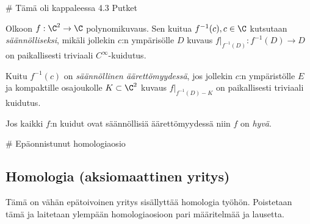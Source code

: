 # Tämä oli kappaleessa 4.3 Putket
\begin{maaritelma}
    Olkoon $f:\C^2\to\C$ polynomikuvaus. Sen kuitua $f^{-1}(c),c\in\C$ kutsutaan \emph{säännölliseksi}, mikäli jollekin $c$:n ympärisölle $D$ kuvaus $f|_{f^{-1}(D)}:f^{-1}(D)\to D$ on paikallisesti triviaali $C^\infty$-kuidutus.

    Kuitu $f^{-1}(c)$ on \emph{säännöllinen äärettömyydessä}, jos jollekin $c$:n ympäristölle $E$ ja kompaktille osajoukolle $K\subset\C^2$ kuvaus $f|_{f^{-1}(D)-K}$ on paikallisesti triviaali kuidutus. 

    Jos kaikki $f$:n kuidut ovat säännöllisiä äärettömyydessä niin $f$ on \emph{hyvä}.
\end{maaritelma}

# Epäonnistunut homologiaosio
\subsection{Homologia (aksiomaattinen yritys)}
Tämä on vähän epätoivoinen yritys sisällyttää homologia työhön. Poistetaan tämä ja laitetaan ylempään homologiaosioon pari määritelmää ja lausetta.

